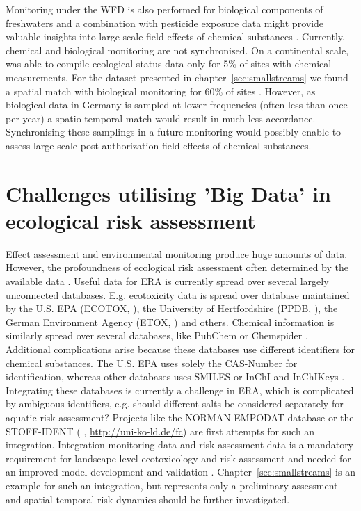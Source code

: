 Monitoring under the WFD is also performed for biological components of freshwaters and a combination with pesticide exposure data might provide valuable insights into large-scale field effects of chemical substances \citep{schipper_deriving_2014}.
Currently, chemical and biological monitoring are not synchronised.
On a continental scale, \citet{malaj_organic_2014} was able to compile ecological status data only for 5\% of sites with chemical measurements.
For the dataset presented in chapter~\ref{sec:smallstreams} we found a spatial match with biological monitoring for 60\% of sites \citep{brinke_umsetzung_2016}.
However, as biological data in Germany is sampled at lower frequencies (often less than once per year) a spatio-temporal match would result in much less accordance. 
Synchronising these samplings in a future monitoring would possibly enable to assess large-scale post-authorization field effects of chemical substances.



\section{Challenges utilising 'Big Data' in ecological risk assessment}

Effect assessment and environmental monitoring produce huge amounts of data. 
However, the profoundness of ecological risk assessment often determined by the available data \citep{van_den_brink_new_2016}.
Useful data for ERA is currently spread over several largely unconnected databases. 
E.g. ecotoxicity data is spread over database maintained by the U.S. EPA (ECOTOX, \citet{u.s._epa_ecotox_2016}), the University of Hertfordshire (PPDB, \citet{lewis_international_2016}), the German Environment Agency (ETOX, \citet{umweltbundesamt_etox:_2016}) and others. 
Chemical information is similarly spread over several databases, like PubChem \citep{kim_pubchem_2016} or Chemspider \citep{pence_chemspider:_2010}.
Additional complications arise because these databases use different identifiers for chemical substances. 
The U.S. EPA \citep{u.s._epa_ecotox_2016} uses solely the CAS-Number for identification, whereas other databases uses SMILES \citep{weininger_smiles._1990} or InChI and InChIKeys \citep{heller_inchi_2015}. 
Integrating these databases is currently a challenge in ERA, which is complicated by ambiguous identifiers, e.g. should different salts be considered separately for aquatic risk assessment?
Projects like the NORMAN EMPODAT database \citep{brack_norman_2012} or the STOFF-IDENT (\citeauthor{huckele_risk_2013} \cite*{huckele_risk_2013}, \url{http://uni-ko-ld.de/fc}) are first attempts for such an integration.
Integration monitoring data and risk assessment data is a mandatory requirement for landscape level ecotoxicology and risk assessment \citep{focks_challenge:_2014} and needed for an improved model development and validation \citep{knabel_regulatory_2012, brock_aquatic_2006}. 
Chapter~\ref{sec:smallstreams} is an example for such an integration, but represents only a preliminary assessment and spatial-temporal risk dynamics should be further investigated. 

